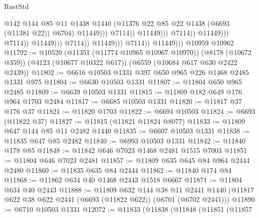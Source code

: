 \begin{lexlean}{RustStd}
\begin{coremodule}
                                                            @142
                                                            @144
                                                            @85
                                                            @11
                                                            @1438
                                                            @1440
                                                            (@11376
                                                              @22
                                                              @85
                                                              @22
                                                              @1438
                                                              (@6693 (@11381 @22))
                                                              @6704)
                                                            @11449)))
                                                      @7114))
                                                  @11449)))
                                            @7114))
                                        @11449)))
                                  @7114))
                              @11449)))
                        @7114))
                    @11449)))
              @7114))
          @11449)))
    @10959
    @10962
@11792 := @10520
    (@11351 (@11774 @10965 @10967 @10970))
    (@8178 (@10672 @359))
    (@4123 (@10677 @10322 @617))
    (@6559 (@10684 @617 @630 @2422 @2439))
@11802 := @6616 @10503 @1331 @397 @650 @965 @226 @1468 @2485 @1331 @975
@11804 := @6630 @10503 @1331
@11807 := @11804 @650 @965 @2485
@11809 := @6639 @10503 @1331
@11815 := @11809 @182 @649 @176 @964 @1703 @2484
@11817 := @6685 @10503 @1331
@11820 := @11817 @37 @176 @37
@11821 := @11820 @1703
@11822 := @6694 @10503
@11824 := @6693 (@11822 @37)
@11827 := @11815 (@11821 @11824 @8077)
@11833 := @11809 @647 @144 @85 @11 @2482 @1440
@11835 := @6607 @10503 @1331
@11838 := @11835 @647 @85 @2482
@11840 := @6993 @10503 @1331
@11842 := @11840 @178 @85
@11848 := @11842 @646 @7023 @1468 @2481 @1515 @7003
@11851 := @11804 @646 @7023 @2481
@11857 := @11809 @635 @645 @84 @964 @2444 @2480
@11860 := @11835 @635 @84 @2444
@11862 := @11840 @174 @84
@11868 := @11862 @634 @40 @1468 @2443 @1518 @6667
@11871 := @11804 @634 @40 @2443
@11888 := @11809
    @632
    @144
    @38
    @11
    @2441
    @1440
    (@11817 @622 @38 @622 @2441 (@6693 (@11822 @622)) (@6701 (@6702 @2441)))
@11890 := @6710 @10503 @1331
@12072 := @11833
    (@11838
      (@11848
        (@11851
          (@11857

\end{coremodule}
\end{lexlean}
